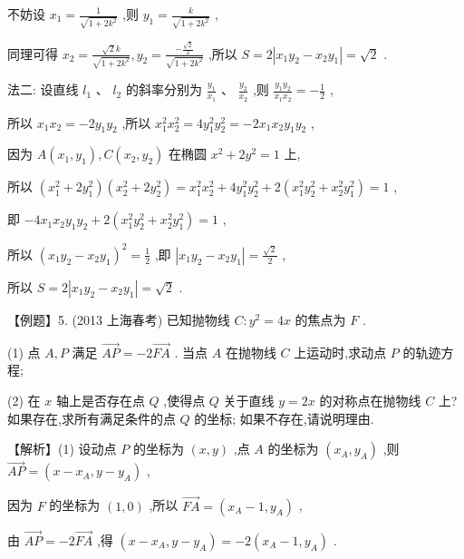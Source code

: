 \documentclass[10pt]{article}
\begin{document}
不妨设 \({x}_{1} = \frac{1}{\sqrt{1 + 2{k}^{2}}}\) ,则 \({y}_{1} = \frac{k}{\sqrt{1 + 2{k}^{2}}}\) ,

同理可得 \({x}_{2} = \frac{\sqrt{2}k}{\sqrt{1 + 2{k}^{2}}},{y}_{2} = \frac{-\frac{\sqrt{2}}{2}}{\sqrt{1 + 2{k}^{2}}}\) ,所以 \(S = 2\left| {{x}_{1}{y}_{2} - {x}_{2}{y}_{1}}\right|  = \sqrt{2}\) .

法二: 设直线 \({l}_{1}\text{ 、 }{l}_{2}\) 的斜率分别为 \(\frac{{y}_{1}}{{x}_{1}}\text{ 、 }\frac{{y}_{2}}{{x}_{2}}\) ,则 \(\frac{{y}_{1}{y}_{2}}{{x}_{1}{x}_{2}} =  - \frac{1}{2}\) ,

所以 \({x}_{1}{x}_{2} =  - 2{y}_{1}{y}_{2}\) ,所以 \({x}_{1}^{2}{x}_{2}^{2} = 4{y}_{1}^{2}{y}_{2}^{2} =  - 2{x}_{1}{x}_{2}{y}_{1}{y}_{2}\) ,

因为 \(A\left( {{x}_{1},{y}_{1}}\right) ,C\left( {{x}_{2},{y}_{2}}\right)\) 在椭圆 \({x}^{2} + 2{y}^{2} = 1\) 上,

所以 \(\left( {{x}_{1}^{2} + 2{y}_{1}^{2}}\right) \left( {{x}_{2}^{2} + 2{y}_{2}^{2}}\right)  = {x}_{1}^{2}{x}_{2}^{2} + 4{y}_{1}^{2}{y}_{2}^{2} + 2\left( {{x}_{1}^{2}{y}_{2}^{2} + {x}_{2}^{2}{y}_{1}^{2}}\right)  = 1\) ,

即 \(- 4{x}_{1}{x}_{2}{y}_{1}{y}_{2} + 2\left( {{x}_{1}^{2}{y}_{2}^{2} + {x}_{2}^{2}{y}_{1}^{2}}\right)  = 1\) ,

所以 \({\left( {x}_{1}{y}_{2} - {x}_{2}{y}_{1}\right) }^{2} = \frac{1}{2}\) ,即 \(\left| {{x}_{1}{y}_{2} - {x}_{2}{y}_{1}}\right|  = \frac{\sqrt{2}}{2}\) ,

所以 \(S = 2\left| {{x}_{1}{y}_{2} - {x}_{2}{y}_{1}}\right|  = \sqrt{2}\) .

【例题】5. (2013 上海春考) 已知抛物线 \(C : {y}^{2} = {4x}\) 的焦点为 \(F\) .

(1) 点 \(A,P\) 满足 \(\overrightarrow{AP} =  - 2\overrightarrow{FA}\) . 当点 \(A\) 在抛物线 \(C\) 上运动时,求动点 \(P\) 的轨迹方程;

(2) 在 \(x\) 轴上是否存在点 \(Q\) ,使得点 \(Q\) 关于直线 \(y = {2x}\) 的对称点在抛物线 \(C\) 上? 如果存在,求所有满足条件的点 \(Q\) 的坐标; 如果不存在,请说明理由.

【解析】(1) 设动点 \(P\) 的坐标为 \(\left( {x,y}\right)\) ,点 \(A\) 的坐标为 \(\left( {{x}_{A},{y}_{A}}\right)\) ,则 \(\overrightarrow{AP} = \left( {x - {x}_{A},y - {y}_{A}}\right)\) ,

因为 \(F\) 的坐标为 \(\left( {1,0}\right)\) ,所以 \(\overrightarrow{FA} = \left( {{x}_{A} - 1,{y}_{A}}\right)\) ,

由 \(\overrightarrow{AP} =  - 2\overrightarrow{FA}\) ,得 \(\left( {x - {x}_{A},y - {y}_{A}}\right)  =  - 2\left( {{x}_{A} - 1,{y}_{A}}\right)\) .
\end{document}
